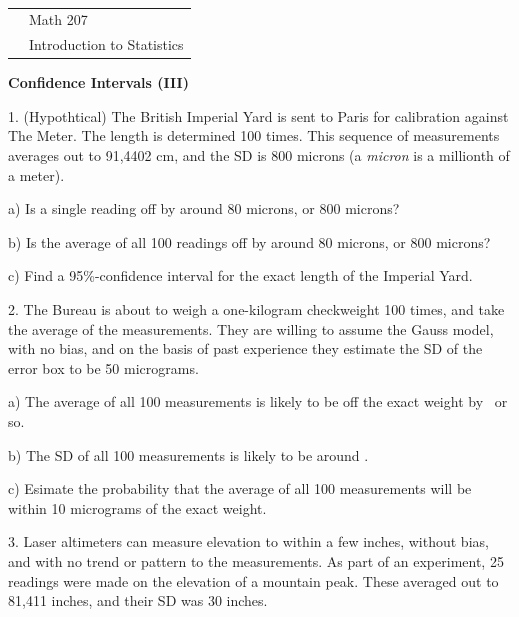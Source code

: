 \documentclass[10pt]{article}
\begin{document}
{{\ }\hfill\small
\begin{tabular}{cl}
& Math 207\\
& Introduction to Statistics\\
\end{tabular}
}
\bigskip

\begin{center}
\textbf{\large  Confidence Intervals (III)}
\end{center}

1. (Hypothtical)  The British Imperial Yard is sent to Paris for calibration
against The Meter.  The length is determined 100 times.  This sequence of
measurements averages out to 91,4402 cm, and the SD is 800 microns (a \textit{micron}
is a millionth of a meter).

\hspace{20pt} a) Is a single reading off by around 80 microns, or 800 microns?
\bigskip

\hspace{20pt} b) Is the average of all 100 readings off by around 80 microns, or 800 microns?
\bigskip

\hspace{20pt} c) Find a 95\%-confidence interval for the exact length of the
Imperial Yard.
\vspace{.5in}

2. 
The Bureau is about to weigh a one-kilogram checkweight 100 times, and take
the average of the measurements.  They are willing to assume the
Gauss model, with no bias, and on the basis of past experience they 
estimate the SD of the error box to be 50 micrograms.

\hspace{20pt} a) The average of all 100 measurements is likely to be off
the exact weight by \BL\ or so.
\bigskip

\hspace{20pt} b) The SD of all 100 measurements is likely to be around \BL.
\bigskip
\bigskip

\hspace{20pt} c) Esimate the probability that the average of all 100 measurements
will be within 10 micrograms of the exact weight.
\vspace{.7in}

3. 
Laser altimeters can measure elevation to within a few inches, without bias,
and with no trend or pattern to the measurements.
As part of an experiment, 25 readings were made on the elevation of a mountain peak.
These averaged out to 81,411 inches, and their SD was 30 inches. 
\end{document}
